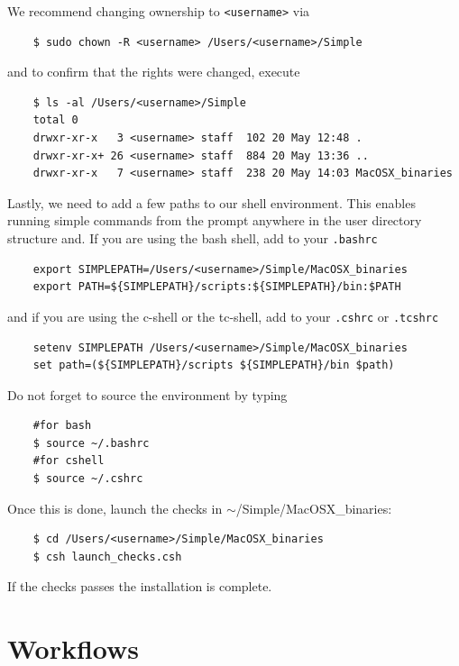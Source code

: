 \documentclass[a4paper,11pt]{article}
\begin{document}
We recommend changing ownership to \texttt{<username>} via   
\begin{verbatim}
    $ sudo chown -R <username> /Users/<username>/Simple
\end{verbatim}
and to confirm that the rights were changed, execute
\begin{verbatim}
    $ ls -al /Users/<username>/Simple
    total 0
    drwxr-xr-x   3 <username> staff  102 20 May 12:48 .
    drwxr-xr-x+ 26 <username> staff  884 20 May 13:36 ..
    drwxr-xr-x   7 <username> staff  238 20 May 14:03 MacOSX_binaries
\end{verbatim}
Lastly, we need to add a few paths to our shell environment. This enables running simple commands from the prompt anywhere in the user directory structure and. If you are using the bash shell, add to your \texttt{.bashrc}
\begin{verbatim}
    export SIMPLEPATH=/Users/<username>/Simple/MacOSX_binaries
    export PATH=${SIMPLEPATH}/scripts:${SIMPLEPATH}/bin:$PATH
\end{verbatim}
and if you are using the c-shell or the tc-shell, add to your \texttt{.cshrc} or \texttt{.tcshrc}
\begin{verbatim}
    setenv SIMPLEPATH /Users/<username>/Simple/MacOSX_binaries
    set path=(${SIMPLEPATH}/scripts ${SIMPLEPATH}/bin $path)
\end{verbatim}
Do not forget to source the environment by typing
\begin{verbatim}
    #for bash
    $ source ~/.bashrc
    #for cshell
    $ source ~/.cshrc
\end{verbatim}
Once this is done, launch the checks in
$\sim$/Simple/MacOSX\_binaries: 
\begin{verbatim}
    $ cd /Users/<username>/Simple/MacOSX_binaries                                         
    $ csh launch_checks.csh
\end{verbatim}
If the checks passes the installation is complete.

\section{Workflows}
\end{document}
